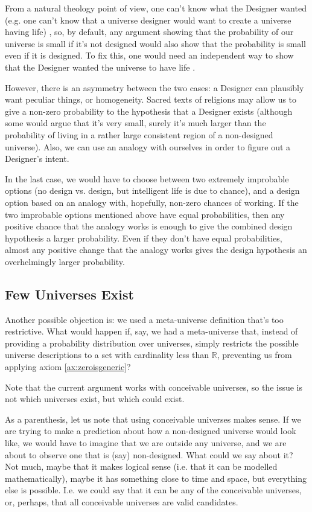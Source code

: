 \documentclass[a4paper
,draft
]{article}
\def\reale{\mathbb{R}}
\begin{document}
From a natural theology point of view, one can't
know what the Designer wanted
(e.g. one can't know that a universe designer would want to create
a universe having life) \parencites{Sober2009}{Narveson2003}, so, by default,
any argument showing that the probability of our universe is small
if it's not designed would also show that the probability is small
even if it is designed.
To fix this, one would need an independent way to show that the Designer
wanted the universe to have life \parencite{Sober2003}.

However, there is an asymmetry between the two cases: a Designer can plausibly
want peculiar things, or homogeneity.
Sacred texts of religions may allow us to give a non-zero probability to
the hypothesis that a Designer exists (although some would argue that it's
very small, surely it's much larger than the probability of living in
a rather large consistent region of a non-designed universe).
Also, we can use an analogy with
ourselves in order to figure out a Designer's intent.

In the last case, we would have to
choose between two extremely improbable options
(no design vs. design, but intelligent life is due to chance),
and a design option based on an analogy with, hopefully,
non-zero chances of working.
If the two improbable options mentioned above have equal probabilities, then
any positive chance that the analogy
works is enough to give the combined design hypothesis a larger probability.
Even if they don't have equal probabilities, almost any positive change
that the analogy works gives the design hypothesis an overhelmingly larger
probability.

\subsection{Few Universes Exist}
\label{sec:fewuniverses}

Another possible objection is: we used a meta-universe definition that's too
restrictive. What would happen if, say, we had a meta-universe that, instead
of providing a probability distribution over universes, simply restricts the
possible universe descriptions to a set with cardinality less than $\reale$,
preventing us from applying axiom \ref{ax:zeroisgeneric}?

Note that the current argument works with conceivable universes, so the issue
is not which universes exist, but which could exist.

As a parenthesis, let us note that using conceivable universes makes sense.
If we are
trying to make a prediction about how a non-designed universe would
look like, we would have to imagine that we are outside any universe, and we are
about to observe one that is (say) non-designed. What could we say about it?
Not much, maybe that it makes logical sense (i.e. that it can be modelled
mathematically), maybe it has something close to time and space, but
everything else is possible.
I.e. we could say that it can be any
of the conceivable universes, or, perhaps,
that all conceivable universes are valid candidates.
\end{document}
